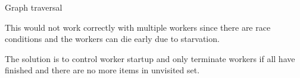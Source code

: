 \begin{algorithm}[H]
    \caption{Graph traversal}
\begin{algorithmic}[1]


    
    \Spawn
                \EndIf
            \EndFor
        \EndWhile
    \EndSpawn

\end{algorithmic}
\end{algorithm}

This would not work correctly with multiple workers since there are
race conditions and the workers can die early due to starvation.

The solution is to control worker startup and only terminate workers 
if all have finished and there are no more items in unvisited set.

